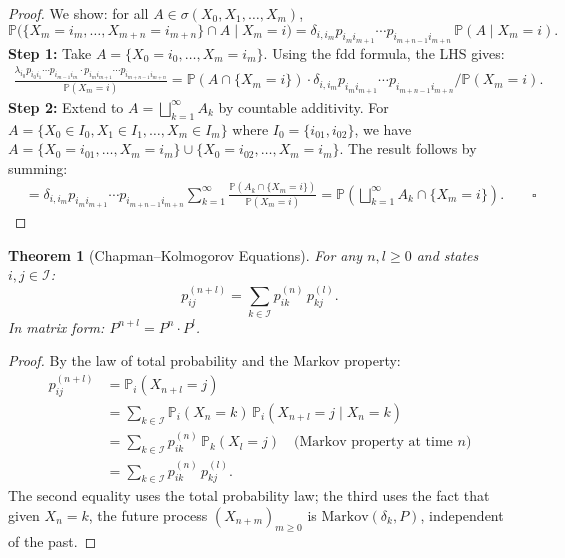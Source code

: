 \documentclass[12pt, a4paper]{article}
\theoremstyle{definition}
\theoremstyle{plain}
\newtheorem{theorem}{Theorem}[section]
\newcommand{\PP}{\mathbb{P}}
\newcommand{\II}{\mathcal{I}}
\begin{document}
\begin{proof}
We show: for all $A \in \sigma(X_0, X_1, \ldots, X_m)$,
\begin{equation*}
  \PP\bigl(\{X_m = i_m, \ldots, X_{m+n} = i_{m+n}\} \cap A \mid X_m = i\bigr)
  = \delta_{i,i_m} p_{i_m i_{m+1}} \cdots p_{i_{m+n-1} i_{m+n}} \,\PP(A \mid X_m = i).
\end{equation*}
\textbf{Step 1:} Take $A = \{X_0 = i_0, \ldots, X_m = i_m\}$. Using the fdd formula, the LHS gives:
\begin{align*}
  \frac{\lambda_{i_0} p_{i_0 i_1}\cdots p_{i_{m-1} i_m} \cdot p_{i_m i_{m+1}} \cdots p_{i_{m+n-1} i_{m+n}}}{\PP(X_m = i)}
  = \PP(A \cap \{X_m = i\}) \cdot \delta_{i,i_m} p_{i_m i_{m+1}} \cdots p_{i_{m+n-1} i_{m+n}} / \PP(X_m = i).
\end{align*}
\textbf{Step 2:} Extend to $A = \bigsqcup_{k=1}^\infty A_k$ by countable additivity. For $A = \{X_0 \in I_0, X_1 \in I_1, \ldots, X_m \in I_m\}$ where $I_0 = \{i_{01}, i_{02}\}$, we have $A = \{X_0 = i_{01}, \ldots, X_m = i_m\} \cup \{X_0 = i_{02}, \ldots, X_m = i_m\}$. The result follows by summing:
\begin{align*}
  &= \delta_{i,i_m} p_{i_m i_{m+1}} \cdots p_{i_{m+n-1} i_{m+n}} \sum_{k=1}^\infty \frac{\PP(A_k \cap \{X_m = i\})}{\PP(X_m = i)} = \PP\!\left(\bigsqcup_{k=1}^\infty A_k \cap \{X_m = i\}\right). \qquad \square
\end{align*}
\end{proof}

\begin{theorem}[Chapman--Kolmogorov Equations]
For any $n, l \ge 0$ and states $i, j \in \II$:
\[
  p_{ij}^{(n+l)} = \sum_{k \in \II} p_{ik}^{(n)}\, p_{kj}^{(l)}.
\]
In matrix form: $P^{n+l} = P^n \cdot P^l$.
\end{theorem}

\begin{proof}
By the law of total probability and the Markov property:
\begin{align*}
  p_{ij}^{(n+l)} &= \PP_i(X_{n+l} = j) \\
  &= \sum_{k \in \II} \PP_i(X_n = k)\, \PP_i(X_{n+l} = j \mid X_n = k) \\
  &= \sum_{k \in \II} p_{ik}^{(n)}\, \PP_k(X_l = j) \quad \text{(Markov property at time } n\text{)} \\
  &= \sum_{k \in \II} p_{ik}^{(n)}\, p_{kj}^{(l)}.
\end{align*}
The second equality uses the total probability law; the third uses the fact that given $X_n = k$, the future process $(X_{n+m})_{m\ge 0}$ is $\text{Markov}(\delta_k, P)$, independent of the past.
\end{proof}
\end{document}
